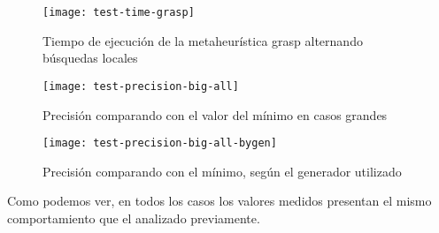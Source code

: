 \begin{figure}[H]
    \centering
    \texttt{[image: test-time-grasp]}
    \caption{Tiempo de ejecución de la metaheurística grasp alternando búsquedas locales}
    \label{fig:test-time-grasp}
\end{figure}

\begin{figure}[H]
    \centering
    \texttt{[image: test-precision-big-all]}
    \caption{Precisión comparando con el valor del mínimo en casos grandes}
    \label{fig:test-precision-big-all}
\end{figure}

\begin{figure}[H]
    \centering
    \texttt{[image: test-precision-big-all-bygen]}
    \caption{Precisión comparando con el mínimo, según el generador utilizado}
    \label{fig:test-precision-big-all-bygen}
\end{figure}

Como podemos ver, en todos los casos los valores medidos presentan el mismo comportamiento que el analizado previamente.
